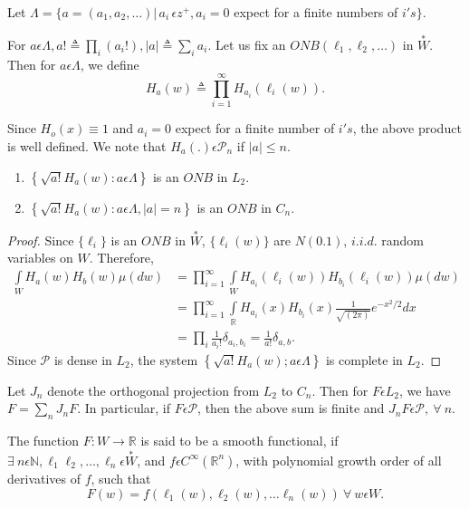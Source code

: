 Let $\Lambda = \{a=(a_1, a_2, \dots)|\,a_i \,\epsilon  z^+, a_i =0$
expect for a finite numbers of $i' s\}$.  
  
For $a \epsilon  \Lambda, a! \triangleq \prod\limits_{i} (a_i!), |a|
\triangleq \sum\limits_{i} a_i$. Let us fix an $ONB (\ell_1, \ell_2,
\ldots)$ in $\overset{\ast}{W}$. Then for $a \epsilon  \Lambda$, we define   
  $$
  H_a(w) \triangleq \prod_{i=1}^\infty H_{a_i}(\ell_i(w)).
  $$ 
 
Since $H_o(x) \equiv 1$ and $a_i =0$ expect for a finite number of
$i's$, the above product is well defined. We note that $H_a(.)
\epsilon  \mathcal{P}_n$ if $|a| \le n$. 

\setcounter{proposition}{1}
\begin{proposition}%
   \begin{enumerate}[\rm (i)]
   \item $\left\{ \sqrt{a!} H_a(w): a \epsilon  \Lambda \right\}$ is
     an $ONB$ in $L_2$.\pageoriginale  

   \item $ \left\{ \sqrt{a!} H_a(w): a \epsilon  \Lambda,
     |a|=n\right\}$ is an $ONB$ in $C_n$. 
   \end{enumerate}
\end{proposition}  

\begin{proof}
Since $\{\ell_i\}$ is an $ONB$ in $\overset{\ast}{W}$, $\{\ell_i (w)\}$ are
$N(0.1)$, $i.i.d$. random variables on $W$. Therefore, 
\begin{align*}
  \int\limits_{W} H_a(w) H_b(w) \mu (dw) & = \prod_{i=1}^{\infty}
  \int\limits_{W} H_{a_i} (\ell_i (w))H_{b_i} (\ell_i(w)) \mu (dw)\\ 
  &= \prod_{i=1}^{\infty} \int\limits_{\mathbb{R}}
  H_{a_i}(x)H_{b_i}(x) \frac{1}{\sqrt{(2 \pi)}} e^{-x^2/2} dx\\ 
  &=  \prod_{i} \frac{1}{a_i !} \delta_{a_i, b_i} = \frac{1}{a!}
  \delta_{a,b}. 
\end{align*}
Since $\mathcal{P}$ is dense in $L_2$, the system $\left\{ \sqrt{a!}
H_a(w);  a \epsilon  \Lambda\right\}$ is complete in $L_2$. 
\end{proof}

Let $J_n$ denote the orthogonal projection from $L_2$ to $C_n$. Then
for $F \epsilon  L_2$, we have $F= \sum\limits_{n} J_n F$. In
particular, if $F \epsilon  \mathcal{P}$, then the above sum is
finite and $J_n F \epsilon  \mathcal{P}, ~\forall~ n$. 

\begin{definition}%
  The function $F: W \to \mathbb{R}$ is said to be a smooth
    functional, if ~$\exists~ n \epsilon  \mathbb{N}, \ell_1 \ell_2, \ldots,
  \ell_n \epsilon \overset{\ast}{W}$, and $f \epsilon  C^\infty(\mathbb{R}^n)$,
  with polynomial growth order of all derivatives of $f$, such that  
  $$
  F(w)=f(\ell_1(w), \ell_2(w), \ldots \ell_n(w)) ~\forall~ w
  \epsilon   W. 
  $$  
\end{definition}


